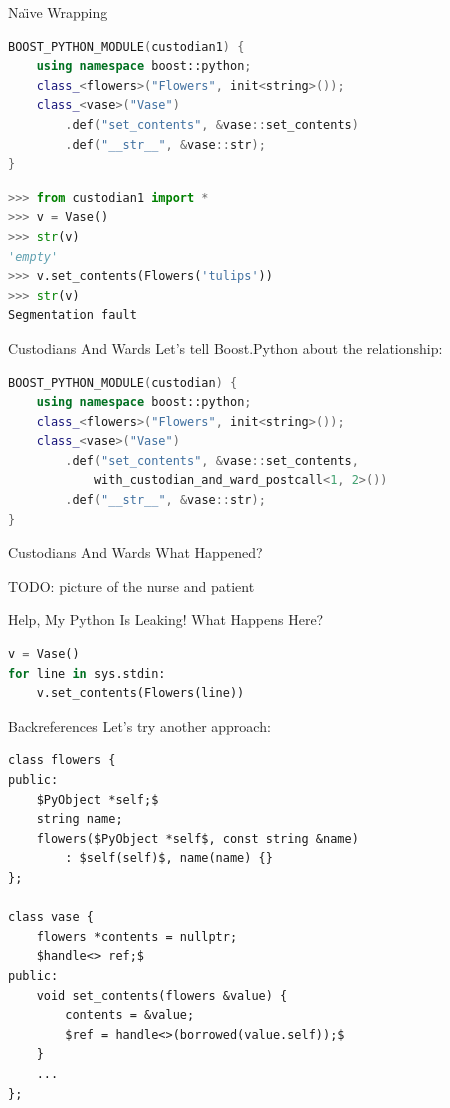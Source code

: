 \documentclass{beamer}
\begin{document}
\begin{frame}[fragile]{Na{\"\i}ve Wrapping}
  \begin{lstlisting}[language=c++]
BOOST_PYTHON_MODULE(custodian1) {
    using namespace boost::python;
    class_<flowers>("Flowers", init<string>());
    class_<vase>("Vase")
        .def("set_contents", &vase::set_contents)
        .def("__str__", &vase::str);
}
  \end{lstlisting}
  \pause
  \begin{lstlisting}[language=python,numbers=none]
>>> from custodian1 import *
>>> v = Vase()
>>> str(v)
'empty'
>>> v.set_contents(Flowers('tulips'))
>>> str(v)
Segmentation fault
  \end{lstlisting}
\end{frame}

\begin{frame}[fragile=singleslide]{Custodians And Wards}
  Let's tell Boost.Python about the relationship:
  \begin{lstlisting}[language=c++]
BOOST_PYTHON_MODULE(custodian) {
    using namespace boost::python;
    class_<flowers>("Flowers", init<string>());
    class_<vase>("Vase")
        .def("set_contents", &vase::set_contents,
            with_custodian_and_ward_postcall<1, 2>())
        .def("__str__", &vase::str);
}
  \end{lstlisting}
\end{frame}

\begin{frame}{Custodians And Wards}
  What Happened?

  TODO: picture of the nurse and patient
\end{frame}

\begin{frame}[fragile=singleslide]{Help, My Python Is Leaking!}
  What Happens Here?
  \begin{lstlisting}[language=python]
v = Vase()
for line in sys.stdin:
    v.set_contents(Flowers(line))
  \end{lstlisting}
\end{frame}

\begin{frame}[fragile=singleslide]{Backreferences}
  Let's try another approach:
  \begin{lstlisting}[language={[extra]c++}]
class flowers {
public:
    $PyObject *self;$
    string name;
    flowers($PyObject *self$, const string &name)
        : $self(self)$, name(name) {}
};

class vase {
    flowers *contents = nullptr;
    $handle<> ref;$
public:
    void set_contents(flowers &value) {
        contents = &value;
        $ref = handle<>(borrowed(value.self));$
    }
    ...
};
  \end{lstlisting}
\end{frame}
\end{document}
